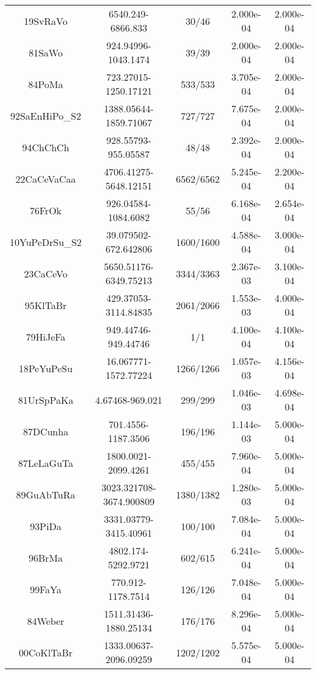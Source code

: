 \begin{longtable}{c c c c c}
19SvRaVo \cite{19SvRaVo} & 6540.249-6866.833 & 30/46 & 2.000e-04 & 2.000e-04 \\
81SaWo \cite{81SaWo} & 924.94996-1043.1474 & 39/39 & 2.000e-04 & 2.000e-04 \\
84PoMa \cite{84PoMa} & 723.27015-1250.17121 & 533/533 & 3.705e-04 & 2.000e-04 \\
92SaEnHiPo_S2 \cite{92SaEnHiPo_S2} & 1388.05644-1859.71067 & 727/727 & 7.675e-04 & 2.000e-04 \\
94ChChCh \cite{94ChChCh} & 928.55793-955.05587 & 48/48 & 2.392e-04 & 2.000e-04 \\
22CaCeVaCaa \cite{22CaCeVaCaa} & 4706.41275-5648.12151 & 6562/6562 & 5.245e-04 & 2.200e-04 \\
76FrOk \cite{76FrOk} & 926.04584-1084.6082 & 55/56 & 6.168e-04 & 2.654e-04 \\
10YuPeDrSu_S2 \cite{10YuPeDrSu_S2} & 39.079502-672.642806 & 1600/1600 & 4.588e-04 & 3.000e-04 \\
23CaCeVo \cite{23CaCeVo} & 5650.51176-6349.75213 & 3344/3363 & 2.367e-03 & 3.100e-04 \\
95KlTaBr \cite{95KlTaBr} & 429.37053-3114.84835 & 2061/2066 & 1.553e-03 & 4.000e-04 \\
79HiJeFa \cite{79HiJeFa} & 949.44746-949.44746 & 1/1 & 4.100e-04 & 4.100e-04 \\
18PeYuPeSu \cite{18PeYuPeSu} & 16.067771-1572.77224 & 1266/1266 & 1.057e-03 & 4.156e-04 \\
81UrSpPaKa \cite{81UrSpPaKa} & 4.67468-969.021 & 299/299 & 1.046e-03 & 4.698e-04 \\
87DCunha \cite{87DCunha} & 701.4556-1187.3506 & 196/196 & 1.144e-03 & 5.000e-04 \\
87LeLaGuTa \cite{87LeLaGuTa} & 1800.0021-2099.4261 & 455/455 & 7.960e-04 & 5.000e-04 \\
89GuAbTuRa \cite{89GuAbTuRa} & 3023.321708-3674.900809 & 1380/1382 & 1.280e-03 & 5.000e-04 \\
93PiDa \cite{93PiDa} & 3331.03779-3415.40961 & 100/100 & 7.084e-04 & 5.000e-04 \\
96BrMa \cite{96BrMa} & 4802.174-5292.9721 & 602/615 & 6.241e-04 & 5.000e-04 \\
99FaYa \cite{99FaYa} & 770.912-1178.7514 & 126/126 & 7.048e-04 & 5.000e-04 \\
84Weber \cite{84Weber} & 1511.31436-1880.25134 & 176/176 & 8.296e-04 & 5.000e-04 \\
00CoKlTaBr \cite{00CoKlTaBr} & 1333.00637-2096.09259 & 1202/1202 & 5.575e-04 & 5.000e-04 \\

\end{longtable}
